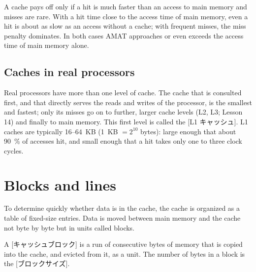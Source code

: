 \documentclass[../main.tex]{subfiles}
\begin{document}
\begin{note}
  A cache pays off only if a hit is much faster than an access to main
  memory and misses are rare.  With a hit time close to the access time of
  main memory, even a hit is about as slow as an access without a cache;
  with frequent misses, the miss penalty dominates.  In both cases AMAT
  approaches or even exceeds the access time of main memory alone.
\end{note}

\subsection{Caches in real processors}

Real processors have more than one level of cache.  The cache that is consulted first, and that directly serves
the reads and writes of the processor, is the smallest and fastest; only its
misses go on to further, larger cache levels (L2, L3; Lesson 14) and finally
to main memory.  This first level is called the [L1
キャッシュ].  L1 caches are typically 16--64~KB (1~KB $= 2^{10}$ bytes):
large enough that about \SI{90}{\percent} of accesses hit, and small enough
that a hit takes only one to three clock cycles.

\section{Blocks and lines}
\label{sec:l12-blocks}

To determine quickly whether data is in the cache, the cache is organized as
a table of fixed-size entries.
Data is moved between main memory and the cache not byte by byte but in
units called blocks.

\begin{definition}
  A [キャッシュブロック] is a run of consecutive bytes of
  memory that is copied into the cache, and evicted from it, as a unit.  The
  number of bytes in a block is the [ブロックサイズ].
\end{definition}
\end{document}
